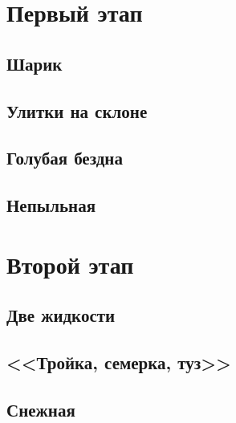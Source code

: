 
\usepackage{libertine}

\gradefalse


\section*{Первый этап}
\subsection{Шарик}

\clearpage
\subsection{Улитки на склоне}

\clearpage
\subsection{Голубая бездна}

\clearpage
\subsection{Непыльная}

\clearpage
\section*{Второй этап}
\subsection{Две жидкости}

\clearpage
\subsection{<<Тройка, семерка, туз>>}

\clearpage
\subsection{Снежная}

